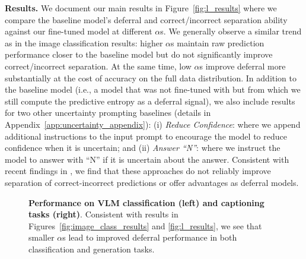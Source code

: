 \textbf{Results.} We document our main results in Figure~\ref{fig:l_results} where we compare the baseline model's deferral and correct/incorrect separation ability against our fine-tuned model at different $\alpha$s. We generally observe a similar trend as in the image classification results: higher $\alpha$s maintain raw prediction performance closer to the baseline model but do not significantly improve correct/incorrect separation. At the same time, low $\alpha$s improve deferral more substantially at the cost of accuracy on the full data distribution. In addition to the baseline model (i.e., a model that was not fine-tuned with \loss but from which we still compute the predictive entropy as a deferral signal), we also include results for two other uncertainty prompting baselines (details in Appendix~\ref{app:uncertainty_appendix}): (i) \emph{Reduce Confidence}: where we append additional instructions to the input prompt to encourage the model to reduce confidence when it is uncertain; and (ii) \emph{Answer ``N''}: where we instruct the model to answer with ``N'' if it is uncertain about the answer. Consistent with recent findings in \cite{kadavath2022language}, we find that these approaches do not reliably improve separation of correct-incorrect predictions or offer advantages as deferral models.

\begin{figure*}

    \centering
    \hfill
    \vrule width 0.5pt
    \hfill
    \caption{\textbf{Performance on VLM classification (left) and captioning tasks (right)}. Consistent with results in Figures~\ref{fig:image_class_results} and \ref{fig:l_results}, we see that smaller $\alpha$s lead to improved deferral performance in both classification and generation tasks.}
    \label{fig:vl_results}
\end{figure*}

